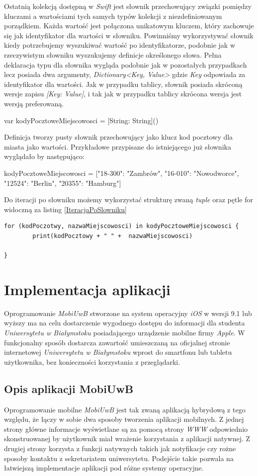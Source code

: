 \documentclass{iiuwb}
\begin{document}
Ostatnią kolekcją dostępną w \textit{Swift} jest słownik przechowujący związki pomiędzy kluczami a wartościami tych samych typów kolekcji z niezdefiniowanym porządkiem. Każda wartość jest połączona unikatowym kluczem, który zachowuje się jak identyfikator dla wartości w słowniku. Powinniśmy wykorzystywać słownik kiedy potrzebujemy wyszukiwać wartość po identyfikatorze, podobnie jak w rzeczywistym słowniku wyszukujemy definicje określonego słowa. Pełna deklaracja typu dla słownika wygląda podobnie jak w pozostałych przypadkach lecz posiada dwa argumenty, \textit{Dictionary<Key, Value>} gdzie \textit{Key} odpowiada za identyfikator dla wartości. Jak w przypadku tablicy, słownik posiada skróconą wersje zapisu \textit{[Key: Value]}, i tak jak w przypadku tablicy skrócona wersja jest wersją preferowaną.
\begin{center}
	var kodyPocztoweMiejscowosci = [String: String]()
\end{center}
Definicja tworzy pusty słownik przechowujący jako klucz kod pocztowy dla miasta jako wartości. Przykładowe przypisane do istniejącego już słownika wyglądało by następująco:  
\begin{center}
	kodyPocztoweMiejscowosci = ["18-300": "Zambrów", "16-010": "Nowodworce", "12524": "Berlin", "20355": "Hamburg"]
\end{center}
Do iteracji po słowniku możemy wykorzystać strukturę zwaną \textit{tuple} oraz pętle for widoczną za listing \ref{IteracjaPoSlowniku}
\begin{lstlisting}[label=IteracjaPoSlowniku, caption=Iteracja po słowniku z wykorzystaniem \textit{tuple} i pętli for.]
for (kodPoczotwy, nazwaMiejscowosci) in kodyPocztoweMiejscowosci {
		print(kodPocztowy + " " +  nazwaMiejscowosci)
		
}
\end{lstlisting}
\cleardoublepage
\chapter{Implementacja aplikacji}
\label{cha:Implementacja aplikacji}
Oprogramowanie \textit{MobiUwB} stworzone na system operacyjny \textit{iOS} w wersji 9.1 lub wyższy ma na celu dostarczenie wygodnego dostępu do informacji dla studenta \textit{Uniwersytetu w Białymstoku} posiadającego urządzenie mobilne firmy \textit{Apple}. W funkcjonalny sposób dostarcza zawartość umieszczaną na oficjalnej stronie internetowej \textit{Uniwersytetu w Białymstoku} wprost do smartfonu lub tabletu użytkownika, bez konieczności korzystania z przeglądarki. 
\section{Opis aplikacji MobiUwB}
Oprogramowanie mobilne \textit{MobiUwB} jest tak zwaną aplikacją hybrydową z tego względu, że łączy w sobie dwa sposoby tworzenia aplikacji mobilnych. Z jednej strony główne informacje wyświetlane są za pomocą strony \textit{WWW} odpowiednio skonstruowanej by użytkownik miał wrażenie korzystania z aplikacji natywnej. Z drugiej strony korzysta z funkcji natywnych takich jak notyfikacje czy rożne sposoby kontaktu z sekretariatem uniwersytetu. Podejście takie pozwala na łatwiejszą implementacje aplikacji pod różne systemy operacyjne.
\end{document}
